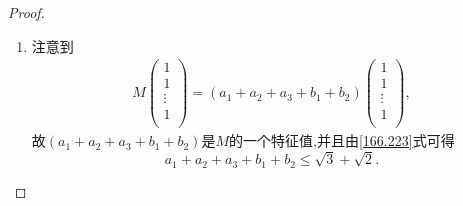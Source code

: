 \documentclass[../../main.tex]{subfiles}%
\begin{document}
\begin{proof}
\begin{enumerate}[(1)]
\begin{align*}
\end{align*}
当$r\left( M \right) =2$时,不妨设
\begin{align*}
M=\begin{pmatrix}
a_1&	a_2&	a_3&	b_1&	b_2\\
a_1&	a_3&	a_2&	b_2&	b_1\\
a_1&	a_2&	a_3&	b_1&	b_2\\
a_1&	a_3&	a_2&	b_2&	b_1\\
a_1&	a_2&	a_3&	b_1&	b_2\\
\end{pmatrix},
\end{align*}
其中$a_3=\max\limits_{i=1,2,3}a_i$,$b_2=\max\limits_{i=1,2}b_i$.否则,$\mathrm{tr}M$都没有上述矩阵的迹大.则
\begin{align*}
a_1+2a_3&\leqslant 3\sqrt{\frac{a_{1}^{2}+2a_{3}^{2}}{3}}=\sqrt{3}\sqrt{\left( a_{1}^{2}+a_{2}^{2}+a_{3}^{2} \right) +a_{3}^{2}-a_{2}^{2}}\\
&=\sqrt{3}\sqrt{\left( a_{1}^{2}+a_{2}^{2}+a_{3}^{2} \right) +a_{3}^{2}-a_{2}^{2}}=\sqrt{3}\sqrt{1+a_{3}^{2}-a_{2}^{2}}\\
&\leqslant \sqrt{6}.
\end{align*}
于是
\begin{align*}
\left( \mathrm{tr}M \right) ^2=\left( a_1+2a_3+2b_2 \right) ^2\leqslant \left( \sqrt{6}+2 \right) ^2=\left( 5+2\sqrt{6} \right) r\left( M \right).
\end{align*}
综上,我们有
\begin{align*}
\left( \mathrm{tr}M \right) ^2\leqslant \left( 5+2\sqrt{6} \right) r\left( M \right).
\end{align*}

\item 注意到
\begin{align*}
M\left( \begin{array}{c}
1\\
1\\
\vdots\\
1\\
\end{array} \right) =\left( a_1+a_2+a_3+b_1+b_2 \right) \left( \begin{array}{c}
1\\
1\\
\vdots\\
1\\
\end{array} \right) ,
\end{align*}
故$\left( a_1+a_2+a_3+b_1+b_2 \right)$是$M$的一个特征值,并且由\eqref{166.223}式可得$$a_1+a_2+a_3+b_1+b_2\leqslant \sqrt{3}+\sqrt{2}.$$
\end{enumerate}
\end{proof}
\end{document}
